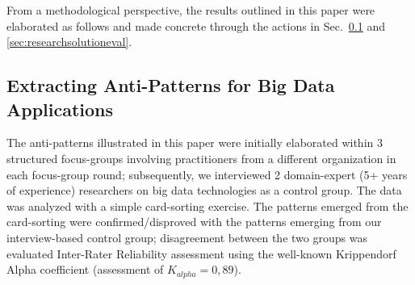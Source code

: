 %
%
%

From a methodological perspective, the results outlined in this paper were elaborated as follows and made concrete through the actions in Sec.~\ref{sec:antipatternextraction} and \ref{sec:researchsolutioneval}.

\subsection{Extracting Anti-Patterns for Big Data Applications}\label{sec:antipatternextraction}

The anti-patterns illustrated in this paper were initially elaborated within 3 structured focus-groups \cite{focusgroup} involving practitioners from a different organization in each focus-group round; subsequently, we interviewed 2 domain-expert (5+ years of experience) researchers on big data technologies as a control group. The data was analyzed with a simple card-sorting exercise. The patterns emerged from the card-sorting were confirmed/disproved with the patterns emerging from our interview-based control group; disagreement between the two groups was evaluated Inter-Rater Reliability assessment using the well-known Krippendorf Alpha coefficient \cite{content} (assessment of $K_{alpha}=0,89$). 

